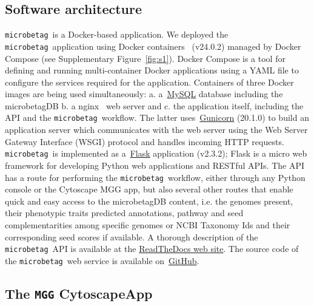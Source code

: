 \documentclass[sn-mathphys,Numbered]{sn-jnl}  %
\theoremstyle{thmstyleone}%
\theoremstyle{thmstyletwo}%
\theoremstyle{thmstylethree}%
\newcommand{\microbetag}{\texttt{microbetag}}
\begin{document}
    \subsection*{Software architecture}
    \label{subsec:webserver}


        \microbetag~\space is a Docker-based application.
        We deployed the \microbetag~\space application using Docker containers~\cite{merkel2014docker} (v24.0.2)  managed by Docker Compose (see Supplementary Figure~\ref{fig:s1}).
        Docker Compose is a tool for defining and running multi-container Docker applications using a YAML file to configure the services required for the application.
        Containers of three Docker images are being used simultaneously:
        a. a~\href{https://www.mysql.com}{MySQL} database including the microbetagDB
        b. a nginx~\cite{nginx} web server and 
        c. the application itself, including the API and the \microbetag~\space workflow.
        The latter uses~\href{https://gunicorn.org}{Gunicorn} (20.1.0) to build an application server which communicates with the web server using the Web Server Gateway Interface (WSGI) protocol and handles incoming HTTP requests.
        \microbetag~\space is implemented as a~\href{https://flask.palletsprojects.com/en/3.0.x/}{Flask} application (v2.3.2); 
        Flask is a micro web framework for developing Python web applications and RESTful APIs.
        The API has a route for performing the \microbetag~\space workflow, either through any Python console or the Cytoscape MGG app, but also several other routes that enable quick and easy access to the microbetagDB content, i.e. the genomes present, their phenotypic traits predicted annotations, pathway and seed complementarities among specific genomes or NCBI Taxonomy Ids and their corresponding seed scores if available.
        A thorough description of the \microbetag~\space API is available at the \href{https://hariszaf.github.io/microbetag/docs/api/}{ReadTheDocs web site}. 
        The source code of the \microbetag~\space web service is available on~\href{https://github.com/msysbio/microbetagApp/}{GitHub}.


    \subsection*{The \texttt{MGG} CytoscapeApp}
    \label{subsec:build-cytoapp}
\end{document}
